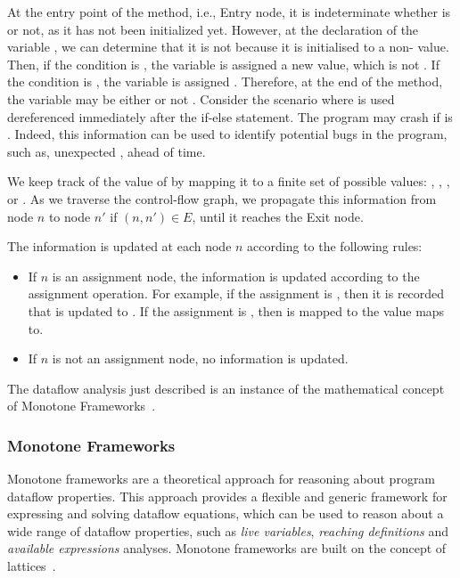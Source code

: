 At the entry point of the method, i.e., Entry node,
it is indeterminate whether  is  or not, as it has not been initialized yet.
However, at the declaration of the variable , we can determine that it is
not  because it is initialised to a non-
value. Then, if the condition  is , the
variable  is assigned a new value, which is not . If the condition
is , the variable  is assigned . Therefore, at the
end of the method, the variable  may be either  or not .
Consider the scenario where  is used dereferenced immediately after the
if-else statement. The program may crash if  is . 
Indeed, this information can be used to identify potential bugs in the program, such as,
unexpected , ahead of time.

We keep track of the value of  by mapping it to a finite set of possible values:
, , , or .
As we traverse the control-flow graph, we propagate this information from node
$n$ to node $n'$ if $(n,n')\in E$, until it reaches the Exit node.

The information is updated at each node $n$ according to the following rules:
\begin{itemize}
\item If $n$ is an assignment node, the information is updated according to the
assignment operation. For example, if the assignment is , then
it is recorded that  is updated to . If the assignment is , then
 is mapped to the value  maps to.
\item If $n$ is not an assignment node, no information is updated.
\end{itemize}

The dataflow analysis just described is an instance of the mathematical concept of
Monotone Frameworks~\cite{Nielson2010Principles}.

\subsubsection*{Monotone Frameworks}
\label{sec:monotoneframeworks}
Monotone frameworks are a theoretical approach for reasoning
about program dataflow properties.
This approach provides a flexible and generic framework for expressing and solving
dataflow equations, which can be used to reason about a wide range of dataflow
properties, such as \emph{live variables}, \emph{reaching definitions} and \emph{available expressions} analyses.
Monotone frameworks are built on the concept of lattices~\cite{Donnellan1968}.

